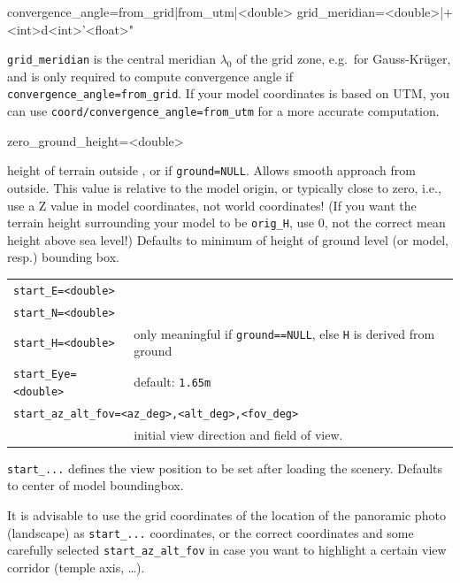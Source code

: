\begin{configfile}
convergence_angle=from_grid|from_utm|<double> 
grid_meridian=<double>|+<int>d<int>'<float>"      
\end{configfile}

\noindent \texttt{grid\_meridian} is the central meridian $\lambda_0$ of the grid
zone, e.g.\ for Gauss-Kr\"uger, and is only required to compute
convergence angle if \texttt{convergence\_angle=from\_grid}. 
If your model coordinates is based on UTM, you can use 
\texttt{coord/convergence\_angle=from\_utm} for a more accurate computation.


\begin{configfile}
zero_ground_height=<double> 
\end{configfile}
height of terrain outside , or if \verb|ground=NULL|.
Allows smooth approach from outside.  This value is relative to the model
origin, or typically close to zero, i.e.,  use a Z value in model coordinates,
not world coordinates! (If you want the terrain height surrounding your model to
be \texttt{orig\_H}, use 0, not the correct mean height above sea level!)  Defaults
to minimum of height of ground level (or model, resp.) bounding box.

\begin{tabularx}{\textwidth}{lX} 
\multicolumn{2}{l}{\texttt{start\_E=<double>}}\\ 
\multicolumn{2}{l}{\texttt{start\_N=<double>}} \\
\texttt{start\_H=<double>}     &only meaningful if \texttt{ground==NULL}, else \texttt{H} is derived from ground \\
\texttt{start\_Eye=<double>}   &default: \texttt{1.65m} \\
\multicolumn{2}{l}{\texttt{start\_az\_alt\_fov=<az\_deg>,<alt\_deg>,<fov\_deg>}}\\
\                                &initial view direction and field of view.\\
\end{tabularx}

\noindent \texttt{start\_...} defines the view position to be set after loading the scenery.
Defaults to center of model boundingbox.

It is advisable to use the grid coordinates of the location of the panoramic
photo (landscape) as \texttt{start\_...} coordinates, or the correct coordinates
and some carefully selected \texttt{start\_az\_alt\_fov} in case you want to highlight 
a certain view corridor (temple axis, \ldots).

